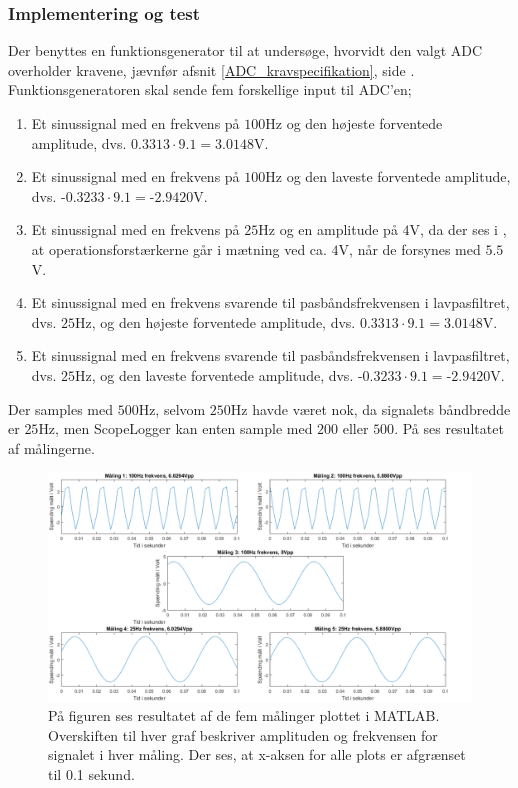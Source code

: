 \subsubsection{Implementering og test}
Der benyttes en funktionsgenerator til at undersøge, hvorvidt den valgt ADC overholder kravene, jævnfør afsnit \ref{ADC_kravspecifikation}, side \pageref{ADC_kravspecifikation}. Funktionsgeneratoren skal sende fem forskellige input til ADC'en;
\begin{enumerate}
	\item Et sinussignal med en frekvens på $100$Hz og den højeste forventede amplitude, dvs. $0.3313 \cdot 9.1 = 3.0148$V.
	\item Et sinussignal med en frekvens på $100$Hz og den laveste forventede amplitude, dvs. -$0.3233 \cdot 9.1 = $-$2.9420$V.
	\item Et sinussignal med en frekvens på $25$Hz og en amplitude på $4$V, da der ses i , at operationsforstærkerne går i mætning ved ca. $4$V, når de forsynes med $5.5$V. 
	\item Et sinussignal med en frekvens svarende til pasbåndsfrekvensen i lavpasfiltret, dvs. $25$Hz, og den højeste forventede amplitude, dvs. $0.3313 \cdot 9.1 = 3.0148$V.
	\item Et sinussignal med en frekvens svarende til pasbåndsfrekvensen i lavpasfiltret, dvs. $25$Hz, og den laveste forventede amplitude, dvs. -$0.3233 \cdot 9.1 = $-$2.9420$V.
\end{enumerate}
\noindent Der samples med $500$Hz, selvom $250$Hz havde været nok, da signalets båndbredde er $25$Hz, men ScopeLogger kan enten sample med $200$ eller $500$. På  ses resultatet af målingerne.

\begin{figure}[H]
	\centering
	\includegraphics[scale=0.45]{figures/cProblemloesning/ADC_Test2_matlab.PNG}
	\caption{På figuren ses resultatet af de fem målinger plottet i MATLAB. Overskiften til hver graf beskriver amplituden og frekvensen for signalet i hver måling. Der ses, at x-aksen for alle plots er afgrænset til 0.1 sekund.}
	\label{fig:ADC_Test}
\end{figure}

